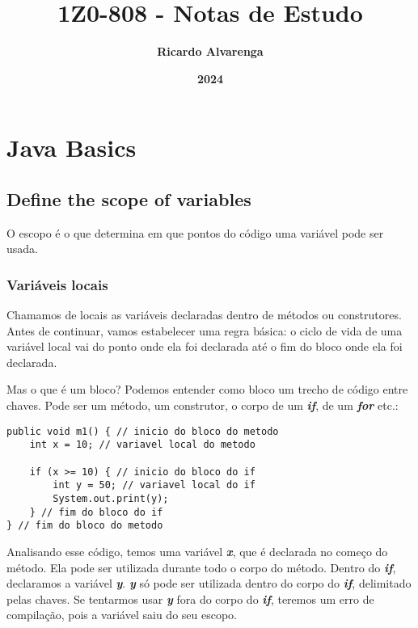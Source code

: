 \documentclass[12pt]{article}
\begin{document}
	
\title{\textbf{{\Huge 1Z0-808 - Notas de Estudo}}} %
\author{\textbf{{\Large Ricardo Alvarenga}}} %
\date{\textbf{{\Large 2024}}} %
\maketitle %
\thispagestyle{empty} %
\newpage

\setcounter{page}{1} %
\tableofcontents %
\pagestyle{fancy}
\fancyfoot[C]{\thepage} %
\newpage

\setcounter{page}{1} %
\pagestyle{fancy}
\fancyfoot[C]{\thepage}

\section{Java Basics}
\subsection{Define the scope of variables}

O escopo é o que determina em que pontos do código uma variável pode ser usada.

\subsubsection{Variáveis locais}

Chamamos de locais as variáveis declaradas dentro de métodos ou construtores. Antes de continuar, vamos estabelecer uma regra básica: o ciclo de vida de uma variável local vai do ponto onde ela foi declarada até o fim do bloco onde ela foi declarada.

Mas o que é um bloco? Podemos entender como bloco um trecho de código entre chaves. Pode ser um método, um construtor, o corpo de um \textbf{\textit{if}}, de um \textbf{\textit{for}} etc.:

\begin{lstlisting}
public void m1() { // inicio do bloco do metodo
	int x = 10; // variavel local do metodo
	
	if (x >= 10) { // inicio do bloco do if
		int y = 50; // variavel local do if
		System.out.print(y);
	} // fim do bloco do if
} // fim do bloco do metodo
\end{lstlisting}

Analisando esse código, temos uma variável \textbf{\textit{x}}, que é declarada no começo do método. Ela pode ser utilizada durante todo o corpo do método. Dentro do \textbf{\textit{if}}, declaramos a variável \textbf{\textit{y}}. \textbf{\textit{y}} só pode ser utilizada dentro do corpo do \textbf{\textit{if}}, delimitado pelas chaves. Se tentarmos usar \textbf{\textit{y}} fora do corpo do \textbf{\textit{if}}, teremos um erro de compilação, pois a variável saiu do seu escopo.
\end{document}
